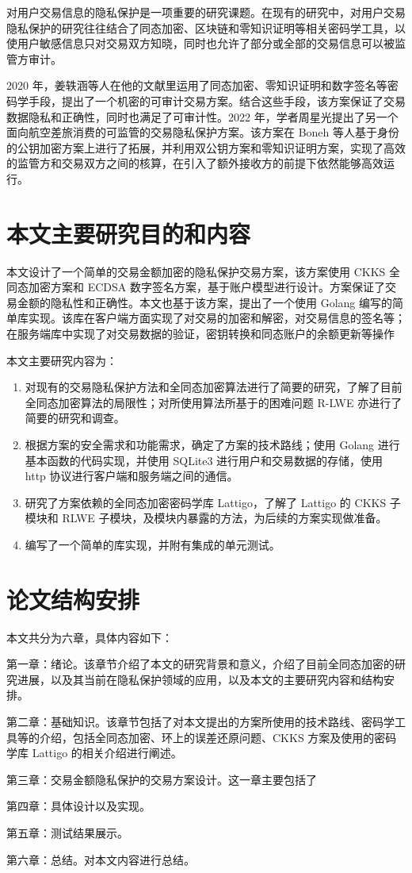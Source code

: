 对用户交易信息的隐私保护是一项重要的研究课题。在现有的研究中，对用户交易隐私保护的研究往往结合了同态加密、区块链和零知识证明等相关密码学工具，以使用户敏感信息只对交易双方知晓，同时也允许了部分或全部的交易信息可以被监管方审计。

2020 年，姜轶涵等人在他的文献里\cite{ACT}运用了同态加密、零知识证明和数字签名等密码学手段，提出了一个机密的可审计交易方案。结合这些手段，该方案保证了交易数据隐私和正确性，同时也满足了可审计性。2022 年，学者周星光提出了另一个面向航空差旅消费的可监管的交易隐私保护方案。\cite{ZXG_Air_privacy}该方案在 Boneh 等人基于身份的公钥加密方案上进行了拓展，并利用双公钥方案和零知识证明方案，实现了高效的监管方和交易双方之间的核算，在引入了额外接收方的前提下依然能够高效运行。

\section{本文主要研究目的和内容}

本文设计了一个简单的交易金额加密的隐私保护交易方案，该方案使用 CKKS 全同态加密方案\cite{cryptoeprint:2016/421}和 ECDSA 数字签名方案，基于账户模型进行设计。方案保证了交易金额的隐私性和正确性。本文也基于该方案，提出了一个使用 Golang 编写的简单库实现。该库在客户端方面实现了对交易的加密和解密，对交易信息的签名等；在服务端库中实现了对交易数据的验证，密钥转换和同态账户的余额更新等操作

本文主要研究内容为：

\begin{enumerate}
    \item 对现有的交易隐私保护方法和全同态加密算法进行了简要的研究，了解了目前全同态加密算法的局限性；对所使用算法所基于的困难问题 R-LWE 亦进行了简要的研究和调查。
    \item 根据方案的安全需求和功能需求，确定了方案的技术路线；使用 Golang 进行基本函数的代码实现，并使用 SQLite3 进行用户和交易数据的存储，使用 http 协议进行客户端和服务端之间的通信。
    \item 研究了方案依赖的全同态加密密码学库 Lattigo\cite{lattigoRepo}，了解了 Lattigo 的 CKKS 子模块和 RLWE 子模块，及模块内暴露的方法，为后续的方案实现做准备。
    \item 编写了一个简单的库实现，并附有集成的单元测试。
\end{enumerate}

\section{论文结构安排}

本文共分为六章，具体内容如下：

第一章：绪论。该章节介绍了本文的研究背景和意义，介绍了目前全同态加密的研究进展，以及其当前在隐私保护领域的应用，以及本文的主要研究内容和结构安排。

第二章：基础知识。该章节包括了对本文提出的方案所使用的技术路线、密码学工具等的介绍，包括全同态加密、环上的误差还原问题、CKKS 方案及使用的密码学库 Lattigo 的相关介绍进行阐述。

第三章：交易金额隐私保护的交易方案设计。这一章主要包括了

第四章：具体设计以及实现。

第五章：测试结果展示。

第六章：总结。对本文内容进行总结。
